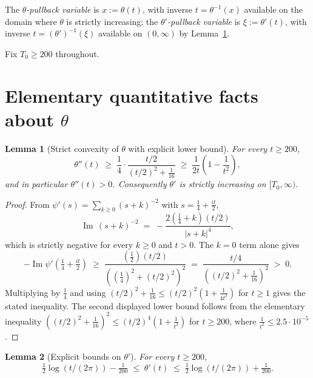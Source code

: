 \documentclass[11pt]{article}
\newtheorem{lemma}{Lemma}
\DeclareMathOperator{\ImOp}{Im}
\let\Im\ImOp
\begin{document}
The \emph{$\theta$-pullback variable} is $x := \theta(t)$, with inverse $t = \theta^{-1}(x)$ available on the domain where $\theta$ is strictly increasing; the \emph{$\theta'$-pullback variable} is $\xi := \theta'(t)$, with inverse $t = (\theta')^{-1}(\xi)$ available on $(0,\infty)$ by Lemma~\ref{lem:mono}.

Fix $T_{0}\ge 200$ throughout.

\section{Elementary quantitative facts about $\theta$}

\begin{lemma}[Strict convexity of $\theta$ with explicit lower bound]\label{lem:mono}
For every $t \ge 200$,
\[
  \theta''(t) \;\ge\; \frac{1}{4}\cdot\frac{t/2}{(t/2)^{2} + \tfrac{1}{16}}
  \;\ge\; \frac{1}{2t}\left(1 - \frac{1}{t^{2}}\right),
\]
and in particular $\theta''(t)>0$. Consequently $\theta'$ is strictly increasing on $[T_{0},\infty)$.
\end{lemma}

\begin{proof}
From $\psi'(s) = \sum_{k\ge 0}(s+k)^{-2}$ with $s = \tfrac14+\tfrac{it}{2}$,
\[
  \Im\,(s+k)^{-2}
  \;=\; -\frac{2(\tfrac14+k)(t/2)}{|s+k|^{4}},
\]
which is strictly negative for every $k\ge 0$ and $t>0$. The $k=0$ term alone gives
\[
  -\Im\psi'(\tfrac14+\tfrac{it}{2}) \;\ge\; \frac{(\tfrac12)(t/2)}{((\tfrac14)^{2}+(t/2)^{2})^{2}}
  \;=\; \frac{t/4}{((t/2)^{2}+\tfrac{1}{16})^{2}} \;>\; 0.
\]
Multiplying by $\tfrac14$ and using $(t/2)^{2}+\tfrac{1}{16}\le (t/2)^{2}(1+\tfrac{1}{4t^{2}})$ for $t\ge 1$ gives the stated inequality. The second displayed lower bound follows from the elementary inequality $((t/2)^{2}+\tfrac{1}{16})^{2} \le (t/2)^{4}(1+\tfrac{1}{t^{2}})$ for $t\ge 200$, where $\tfrac{1}{t^{2}} \le 2.5\cdot 10^{-5}$.
\end{proof}

\begin{lemma}[Explicit bounds on $\theta'$]\label{lem:thetapbound}
For every $t\ge 200$,
\[
  \tfrac{1}{2}\log(t/(2\pi)) - \tfrac{1}{200} \;\le\; \theta'(t) \;\le\; \tfrac{1}{2}\log(t/(2\pi)) + \tfrac{1}{200}.
\]
\end{lemma}
\end{document}
